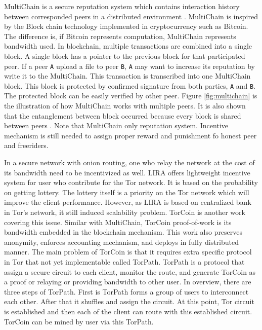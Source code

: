 MultiChain is a secure reputation system which contains interaction history between corresponded peers in a distributed environment \cite{2015:multichain:norberhuis}. MultiChain is inspired by the Block chain technology implemented in cryptocurrency such as Bitcoin. The difference is, if Bitcoin represents computation, MultiChain represents bandwidth used. In blockchain, multiple transactions are combined into a single block. A single block has a pointer to the previous block for that participated peer. If a peer \texttt{A} upload a file to peer \texttt{B}, \texttt{A} may want to increase its reputation by write it to the MultiChain. This transaction is transcribed into one MultiChain block. This block is protected by confirmed signature from both parties, \texttt{A} and \texttt{B}. The protected block can be easily verified by other peer. Figure \ref{fig:multichain} is the illustration of how MultiChain works with multiple peers. It is also shown that the entanglement between block occurred because every block is shared between peers \cite{2015:multichain:norberhuis}. Note that MultiChain only reputation system. Incentive mechanism is still needed to assign proper reward and punishment fo honest peer and freeriders.

In a secure network with onion routing, one who relay the network at the cost of its bandwidth need to be incentivized as well. LIRA \cite{2013:lira:jansen} offers lightweight incentive system for user who contribute for the Tor network. It is based on the probability on getting lottery. The lottery itself is a priority on the Tor network which will improve the client performance. However, as LIRA is based on centralized bank in Tor's network, it still induced scalability problem. TorCoin \cite{2014:torcoin:ghosh} is another work covering this issue. Similar with MultiChain, TorCoin proof-of-work is its bandwidth embedded in the blockchain mechanism. This work also preserves anonymity, enforces accounting mechanism, and deploys in fully distributed manner. The main problem of TorCoin is that it requires extra specific protocol in Tor that not yet implementable called TorPath. TorPath is a protocol that assign a secure circuit to each client, monitor the route, and generate TorCoin as a proof or relaying or providing bandwidth to other user. In overview, there are three steps of TorPath. First is TorPath forms a group of users to interconnect each other. After that it shuffles and assign the circuit. At this point, Tor circuit is established and then each of the client can route with this established circuit. TorCoin can be mined by user via this TorPath.

